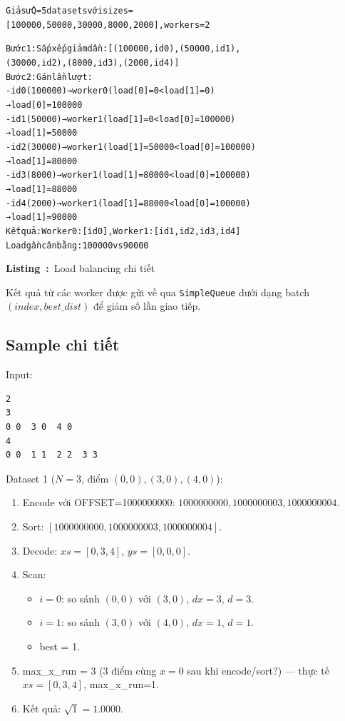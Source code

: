 \documentclass[12pt,a4paper]{article}
\newcounter{vietlisting}
\newenvironment{vietlisting}[1]{%
  \def\vietlistingcaption{#1}%
  \refstepcounter{vietlisting}%
  \begin{tcolorbox}[
    enhanced,
    breakable,
    colback=codebg,
    colframe=codeframe,
    boxrule=0.5pt,
    arc=1mm,
    left=6pt,
    right=6pt,
    top=6pt,
    bottom=4pt
  ]%
  \small\ttfamily\begin{alltt}
}{%
  \end{alltt}\normalfont
  \end{tcolorbox}%
  \begin{center}
    \small\textbf{Listing~\thevietlisting:}~\vietlistingcaption
  \end{center}
}
\begin{document}
\begin{vietlisting}{Load balancing chi tiết}
Giả sử Q=5 datasets với sizes = 
[100000, 50000, 30000, 8000, 2000], workers=2

Bước 1: Sắp xếp giảm dần: [(100000, id0), (50000, id1), 
(30000, id2), (8000, id3), (2000, id4)]
Bước 2: Gán lần lượt:
  - id0 (100000) → worker 0 (load[0]=0 < load[1]=0) 
  → load[0]=100000
  - id1 (50000)  → worker 1 (load[1]=0 < load[0]=100000) 
  → load[1]=50000
  - id2 (30000)  → worker 1 (load[1]=50000 < load[0]=100000) 
  → load[1]=80000
  - id3 (8000)   → worker 1 (load[1]=80000 < load[0]=100000) 
  → load[1]=88000
  - id4 (2000)   → worker 1 (load[1]=88000 < load[0]=100000) 
  → load[1]=90000
Kết quả: Worker 0: [id0], Worker 1: [id1, id2, id3, id4]
Load gần cân bằng: 100000 vs 90000
\end{vietlisting}

Kết quả từ các worker được gửi về qua \texttt{SimpleQueue} dưới dạng batch $(index, best\_dist)$ để giảm số lần giao tiếp.

\subsection{Sample chi tiết}

Input:
\begin{verbatim}
2
3
0 0  3 0  4 0
4
0 0  1 1  2 2  3 3
\end{verbatim}

Dataset 1 ($N=3$, điểm $(0,0), (3,0), (4,0)$):
\begin{enumerate}
  \item Encode với OFFSET=1000000000: $1000000000, 1000000003, 1000000004$.
  \item Sort: $[1000000000, 1000000003, 1000000004]$.
  \item Decode: $xs=[0,3,4]$, $ys=[0,0,0]$.
  \item Scan:
    \begin{itemize}
      \item $i=0$: so sánh $(0,0)$ với $(3,0)$, $dx=3$, $d=3$.
      \item $i=1$: so sánh $(3,0)$ với $(4,0)$, $dx=1$, $d=1$.
      \item best = 1.
    \end{itemize}
  \item max\_x\_run = 3 (3 điểm cùng $x=0$ sau khi encode/sort?) — thực tế $xs=[0,3,4]$, max\_x\_run=1.
  \item Kết quả: $\sqrt{1} = 1.0000$.
\end{enumerate}
\end{document}
